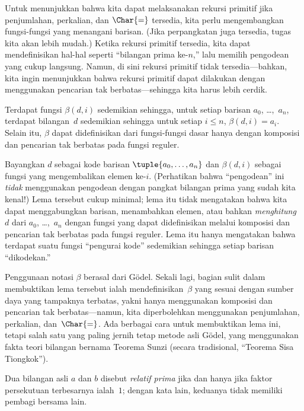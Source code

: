 \documentclass[../../../include/open-logic-section]{subfiles}
\begin{document}


Untuk menunjukkan bahwa kita dapat melaksanakan rekursi primitif jika
penjumlahan, perkalian, dan $\Char{=}$ tersedia, kita perlu mengembangkan
fungsi-fungsi yang menangani barisan. (Jika perpangkatan juga tersedia, tugas
kita akan lebih mudah.) Ketika rekursi primitif tersedia, kita dapat
mendefinisikan hal-hal seperti ``bilangan prima ke-$n$,'' lalu memilih
pengodean yang cukup langsung. Namun, di sini rekursi primitif tidak
tersedia---bahkan, kita ingin menunjukkan bahwa rekursi primitif dapat
dilakukan dengan menggunakan pencarian tak berbatas---sehingga kita harus lebih cerdik.

\begin{lem}
Terdapat fungsi $\beta(d,i)$ sedemikian sehingga, untuk setiap barisan $a_0$,
\dots,~$a_n$, terdapat bilangan~$d$ sedemikian sehingga untuk setiap
$i \le n$, $\beta(d,i) = a_i$. Selain itu, $\beta$ dapat didefinisikan dari
fungsi-fungsi dasar hanya dengan komposisi dan pencarian tak berbatas pada
fungsi reguler.
\end{lem}

Bayangkan $d$ sebagai kode barisan $\tuple{a_0, \dots, a_n}$ dan
$\beta(d,i)$ sebagai fungsi yang mengembalikan elemen ke-$i$. (Perhatikan
bahwa ``pengodean'' ini \emph{tidak} menggunakan pengodean dengan pangkat
bilangan prima yang sudah kita kenal!) Lema tersebut cukup minimal; lema itu
tidak mengatakan bahwa kita dapat menggabungkan barisan, menambahkan elemen,
atau bahkan \emph{menghitung}~$d$ dari $a_0$, \dots,~$a_n$ dengan fungsi yang
dapat didefinisikan melalui komposisi dan pencarian tak berbatas pada fungsi
reguler. Lema itu hanya mengatakan bahwa terdapat suatu fungsi ``pengurai
kode'' sedemikian sehingga setiap barisan ``dikodekan.''

Penggunaan notasi $\beta$ berasal dari G\"odel. Sekali lagi, bagian sulit
dalam membuktikan lema tersebut ialah mendefinisikan~$\beta$ yang sesuai
dengan sumber daya yang tampaknya terbatas, yakni hanya menggunakan komposisi
dan pencarian tak berbatas---namun, kita diperbolehkan menggunakan penjumlahan,
perkalian, dan~$\Char{=}$. Ada berbagai cara untuk membuktikan lema ini,
tetapi salah satu yang paling jernih tetap metode asli G\"odel, yang
menggunakan fakta teori bilangan bernama Teorema Sunzi (secara tradisional,
``Teorema Sisa Tiongkok'').

\begin{defn}
Dua bilangan asli $a$ dan $b$ disebut \emph{relatif prima} jika dan hanya
jika faktor persekutuan terbesarnya ialah~$1$; dengan kata lain, keduanya tidak
memiliki pembagi bersama lain.
\end{defn}
\end{document}
